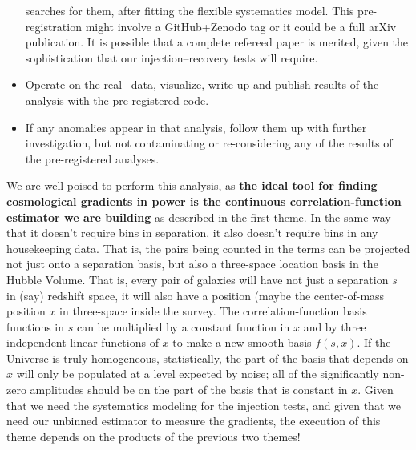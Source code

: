 \documentclass[12pt, fullpage, letterpaper]{article}
\begin{document}
\begin{itemize}
searches for them, after fitting the flexible systematics model.
This pre-registration might involve a GitHub+Zenodo tag or it could be
a full arXiv publication. It is possible that a complete refereed paper
is merited, given the sophistication that our injection--recovery tests will require.
\item
Operate on the real \eBOSS\ data, visualize, write up and publish results of the
analysis with the pre-registered code.
\item
If any anomalies appear in that analysis, follow them up with further
investigation, but not contaminating or re-considering any of the results
of the pre-registered analyses.
\end{itemize}

We are well-poised to perform this analysis, as \textbf{the ideal tool for
  finding cosmological gradients in power is the continuous
  correlation-function estimator we are building} as described in the first theme.
In the same way that it doesn't require bins in separation, it also
doesn't require bins in any housekeeping data. That is, the pairs
being counted in the terms can be projected not just onto a separation
basis, but also a three-space location basis in the Hubble
Volume. That is, every pair of galaxies will have not just a
separation $s$ in (say) redshift space, it will also have a position
(maybe the center-of-mass position $x$ in three-space inside the
survey.  The correlation-function basis functions in $s$ can be
multiplied by a constant function in $x$ and by three independent linear functions of
$x$ to make a new smooth basis $f(s,x)$. If the Universe is truly
homogeneous, statistically, the part of the basis that depends on $x$
will only be populated at a level expected by noise; all of the
significantly non-zero amplitudes should be on the part of the basis
that is constant in $x$.
Given that we need the systematics modeling for the injection tests,
and given that we need our unbinned estimator to measure the gradients,
the execution of this theme depends on the products of the
previous two themes!
\end{document}
